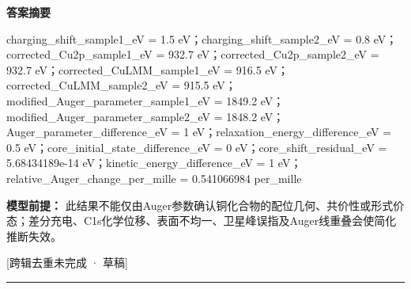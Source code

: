 \documentclass[UTF8,11pt,a4paper]{ctexart}
\begin{document}
\noindent\textbf{答案摘要}\par
charging\_shift\_sample1\_eV = 1.5 eV；charging\_shift\_sample2\_eV = 0.8 eV；corrected\_Cu2p\_sample1\_eV = 932.7 eV；corrected\_Cu2p\_sample2\_eV = 932.7 eV；corrected\_CuLMM\_sample1\_eV = 916.5 eV；corrected\_CuLMM\_sample2\_eV = 915.5 eV；modified\_Auger\_parameter\_sample1\_eV = 1849.2 eV；modified\_Auger\_parameter\_sample2\_eV = 1848.2 eV；Auger\_parameter\_difference\_eV = 1 eV；relaxation\_energy\_difference\_eV = 0.5 eV；core\_initial\_state\_difference\_eV = 0 eV；core\_shift\_residual\_eV = 5.68434189e-14 eV；kinetic\_energy\_difference\_eV = 1 eV；relative\_Auger\_change\_per\_mille = 0.541066984 per\_mille\par
\noindent\textbf{模型前提：}
此结果不能仅由Auger参数确认铜化合物的配位几何、共价性或形式价态；差分充电、C1s化学位移、表面不均一、卫星峰误指及Auger线重叠会使简化推断失效。\par
\noindent\textcolor{red!65!black}{[跨辑去重未完成 · 草稿]} \par
\medskip\hrule\medskip
{}
\end{document}
